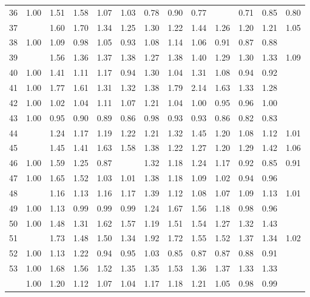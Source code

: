 \begin{tabular}{rrrrrrrrrrrrr}
  36 & 1.00 & 1.51 & 1.58 & 1.07 & 1.03 & 0.78 & 0.90 & 0.77 & \color{blue}{0.64} & 0.71 & 0.85 & 0.80 \\ 
  37 & \color{blue}{1.00} & 1.60 & 1.70 & 1.34 & 1.25 & 1.30 & 1.22 & 1.44 & 1.26 & 1.20 & 1.21 & 1.05 \\ 
  38 & 1.00 & 1.09 & 0.98 & 1.05 & 0.93 & 1.08 & 1.14 & 1.06 & 0.91 & 0.87 & 0.88 & \color{blue}{0.86} \\ 
  39 & \color{blue}{1.00} & 1.56 & 1.36 & 1.37 & 1.38 & 1.27 & 1.38 & 1.40 & 1.29 & 1.30 & 1.33 & 1.09 \\ 
  40 & 1.00 & 1.41 & 1.11 & 1.17 & 0.94 & 1.30 & 1.04 & 1.31 & 1.08 & 0.94 & 0.92 & \color{blue}{0.90} \\ 
  41 & 1.00 & 1.77 & 1.61 & 1.31 & 1.32 & 1.38 & 1.79 & 2.14 & 1.63 & 1.33 & 1.28 & \color{blue}{0.95} \\ 
  42 & 1.00 & 1.02 & 1.04 & 1.11 & 1.07 & 1.21 & 1.04 & 1.00 & 0.95 & 0.96 & 1.00 & \color{blue}{0.91} \\ 
  43 & 1.00 & 0.95 & 0.90 & 0.89 & 0.86 & 0.98 & 0.93 & 0.93 & 0.86 & 0.82 & 0.83 & \color{blue}{0.77} \\ 
  44 & \color{blue}{1.00} & 1.24 & 1.17 & 1.19 & 1.22 & 1.21 & 1.32 & 1.45 & 1.20 & 1.08 & 1.12 & 1.01 \\ 
  45 & \color{blue}{1.00} & 1.45 & 1.41 & 1.63 & 1.58 & 1.38 & 1.22 & 1.27 & 1.20 & 1.29 & 1.42 & 1.06 \\ 
  46 & 1.00 & 1.59 & 1.25 & 0.87 & \color{blue}{0.82} & 1.32 & 1.18 & 1.24 & 1.17 & 0.92 & 0.85 & 0.91 \\ 
  47 & 1.00 & 1.65 & 1.52 & 1.03 & 1.01 & 1.38 & 1.18 & 1.09 & 1.02 & 0.94 & 0.96 & \color{blue}{0.92} \\ 
  48 & \color{blue}{1.00} & 1.16 & 1.13 & 1.16 & 1.17 & 1.39 & 1.12 & 1.08 & 1.07 & 1.09 & 1.13 & 1.01 \\ 
  49 & 1.00 & 1.13 & 0.99 & 0.99 & 0.99 & 1.24 & 1.67 & 1.56 & 1.18 & 0.98 & 0.96 & \color{blue}{0.93} \\ 
  50 & 1.00 & 1.48 & 1.31 & 1.62 & 1.57 & 1.19 & 1.51 & 1.54 & 1.27 & 1.32 & 1.43 & \color{blue}{0.91} \\ 
  51 & \color{blue}{1.00} & 1.73 & 1.48 & 1.50 & 1.34 & 1.92 & 1.72 & 1.55 & 1.52 & 1.37 & 1.34 & 1.02 \\ 
  52 & 1.00 & 1.13 & 1.22 & 0.94 & 0.95 & 1.03 & 0.85 & 0.87 & 0.87 & 0.88 & 0.91 & \color{blue}{0.79} \\ 
  53 & 1.00 & 1.68 & 1.56 & 1.52 & 1.35 & 1.35 & 1.53 & 1.36 & 1.37 & 1.33 & 1.33 & \color{blue}{0.92} \\ 
   \hline
 & 1.00 & 1.20 & 1.12 & 1.07 & 1.04 & 1.17 & 1.18 & 1.21 & 1.05 & 0.98 & 0.99 & \color{blue}{0.91} \\ 
   \hline
\end{tabular}
